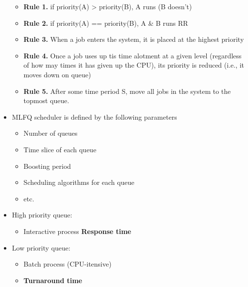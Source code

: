 \documentclass[a4paper,11pt,english]{article}
\begin{document}
\begin{itemize}
\begin{itemize}
            \item \textbf{Rule 1.} if priority(A) > priority(B), A runs (B doesn't)
            \item \textbf{Rule 2.} if priority(A) == priority(B), A \& B runs RR
            \item \textbf{Rule 3.} When a job enters the system, it is placed at the highest priority
            \item \textbf{Rule 4.} Once a job uses up tis time alotment at a given level (regardless of how may times it has given up the CPU), its priority is reduced (i.e., it moves down on queue)
            \item \textbf{Rule 5.} After some time period S, move all jobs in the system to the topmost queue.
        \end{itemize}
    \item MLFQ scheduler is defined by the following parameters
        \begin{itemize}
            \item Number of queues
            \item Time slice of each queue
            \item Boosting period
            \item Scheduling algorithms for each queue
            \item etc.
        \end{itemize}
    \item High priority queue:
        \begin{itemize}
            \item Interactive process
            \textbf{\color{blue} Response time}
        \end{itemize}
    \item Low priority queue:
        \begin{itemize}
            \item Batch process (CPU-itensive)
            \item \textbf{\color{blue} Turnaround time}
        \end{itemize}
\end{itemize}
\end{document}
